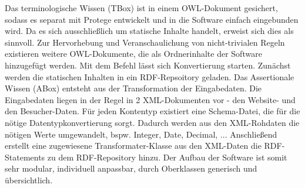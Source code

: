 \documentclass[runningheads,a4paper]{llncs}
\begin{document}
Das terminologische Wissen (TBox) ist in einem OWL-Dokument gesichert, sodass es separat mit Protege entwickelt und in die Software einfach eingebunden wird. 
Da es sich ausschließlich um statische Inhalte handelt, erweist sich dies als sinnvoll. 
Zur Hervorhebung und Veranschaulichung von nicht-trivialen Regeln existieren weitere OWL-Dokumente, die als Ordnerinhalte der Software hinzugefügt werden. 
Mit dem Befehl \cite{ruby-rdf} lässt sich Konvertierung starten. 
Zunächst werden die statischen Inhalten in ein RDF-Repsoitory geladen. 
Das Assertionale Wissen (ABox) entsteht aus der Transformation der Eingabedaten. 
Die Eingabedaten liegen in der Regel in 2 XML-Dokumenten vor - den Website- und den Besucher-Daten.
Für jeden Kontentyp existiert eine Schema-Datei, die für die nötige Datentypkonvertierung sorgt. 
Dadurch werden aus den XML-Rohdaten die nötigen Werte umgewandelt, bspw. Integer, Date, Decimal, ...
Anschließend erstellt eine zugewiesene Transformater-Klasse aus den XML-Daten die RDF-Statements zu dem RDF-Repository hinzu. 
Der Aufbau der Software ist somit sehr modular, individuell anpassbar, durch Oberklassen generisch und übersichtlich.

\newpage
\end{document}
